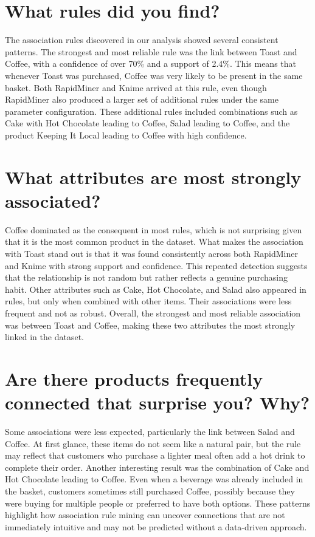 \label{chap:answer-to-questions}

\section*{What rules did you find?}
The association rules discovered in our analysis showed several consistent patterns. The strongest and most 
reliable rule was the link between Toast and Coffee, with a confidence of over 70\% and a support of 2.4\%. 
This means that whenever Toast was purchased, Coffee was very likely to be present in the same basket. Both 
RapidMiner and Knime arrived at this rule, even though RapidMiner also produced a larger set of additional 
rules under the same parameter configuration. These additional rules included combinations such as Cake with 
Hot Chocolate leading to Coffee, Salad leading to Coffee, and the product Keeping It Local leading to 
Coffee with high confidence.


\section*{What attributes are most strongly associated?}
Coffee dominated as the consequent in most rules, which is not surprising given that it is the most common 
product in the dataset. What makes the association with Toast stand out is that it was found consistently 
across both RapidMiner and Knime with strong support and confidence. This repeated detection suggests that 
the relationship is not random but rather reflects a genuine purchasing habit. Other attributes such as Cake, 
Hot Chocolate, and Salad also appeared in rules, but only when combined with other items. Their associations 
were less frequent and not as robust. Overall, the strongest and most reliable association was between Toast 
and Coffee, making these two attributes the most strongly linked in the dataset.


\section*{Are there products frequently connected that surprise you? Why?}
Some associations were less expected, particularly the link between Salad and Coffee. At first glance, these 
items do not seem like a natural pair, but the rule may reflect that customers who purchase a lighter meal 
often add a hot drink to complete their order. Another interesting result was the combination of Cake and Hot 
Chocolate leading to Coffee. Even when a beverage was already included in the basket, customers sometimes still 
purchased Coffee, possibly because they were buying for multiple people or preferred to have both options. 
These patterns highlight how association rule mining can uncover connections that are not immediately intuitive 
and may not be predicted without a data-driven approach.


